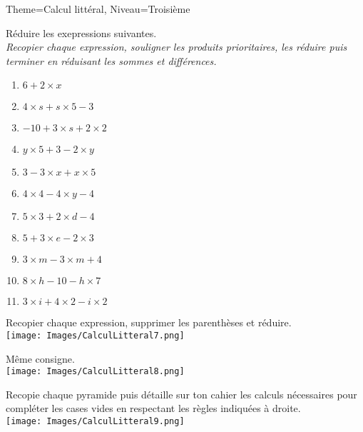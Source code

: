 \documentclass[11pt]{article}
\begin{document}
\begin{multicols}{2}
\begin{Maquette}[Fiche]{Theme=Calcul littéral, Niveau=Troisième}
\columnbreak


\begin{exercice}
    Réduire les exepressions suivantes.\\
    \emph{Recopier chaque expression, souligner les produits prioritaires, les réduire puis terminer en réduisant les sommes et différences.}
    \begin{enumerate}[label=\textbf{\alph*.}]
        \item $6 + 2 \times x$
        \item $4 \times s + s \times 5 - 3$
        \item $-10 + 3 \times s + 2 \times 2$
        \item $y \times 5 + 3 - 2 \times y$
        \item $3 - 3 \times x + x \times 5$
        \item $4 \times 4 - 4 \times y - 4$
        \item $5 \times 3 + 2 \times d - 4$
        \item $5 + 3 \times e - 2 \times 3$
        \item $3 \times m - 3 \times m + 4$
        \item $8 \times h - 10 - h \times 7$
        \item $3 \times i + 4 \times 2 - i \times 2$
    \end{enumerate}
\end{exercice}

\begin{exercice}
    Recopier chaque expression, supprimer les parenthèses et réduire.\\
    \texttt{[image: Images/CalculLitteral7.png]}
\end{exercice}

\columnbreak

\begin{exercice}
    Même consigne.\\
    \texttt{[image: Images/CalculLitteral8.png]}
\end{exercice}


\begin{exercice}
    Recopie chaque pyramide puis détaille sur ton cahier les calculs nécessaires pour compléter les cases vides en respectant les règles indiquées à droite.\\
    \texttt{[image: Images/CalculLitteral9.png]}
\end{exercice}


\end{Maquette}

\end{multicols}
\end{document}
